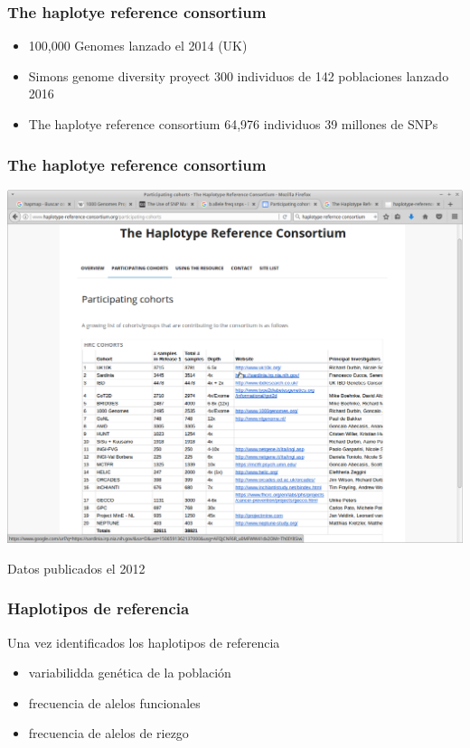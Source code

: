 \documentclass{beamer}\usepackage[]{graphicx}\usepackage[]{color}
\begin{document}
\begin{frame}[fragile]
\frametitle{The haplotye reference consortium}

\begin{itemize}
\item     100,000 Genomes lanzado el 2014 (UK)
\item     Simons genome diversity proyect 300 individuos de 142 poblaciones lanzado 2016
\item     The haplotye reference consortium  64,976 individuos 39 millones de SNPs
\end{itemize}

\end{frame}

\begin{frame}[fragile]
\frametitle{The haplotye reference consortium}

\begin{center}
\includegraphics[width=0.7\linewidth]{haplotref.png}
\end{center}
Datos publicados el 2012
\end{frame}


\begin{frame}[fragile]
\frametitle{Haplotipos de referencia}

Una vez identificados los haplotipos de referencia
\begin{itemize}
\item variabilidda gen\'etica de la poblaci\'on
\item frecuencia de alelos funcionales
\item frecuencia de alelos de riezgo
\end{itemize}

\end{frame}
\end{document}
